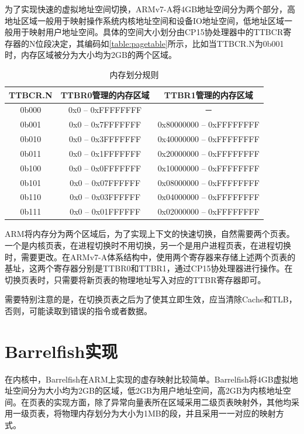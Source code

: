 \documentclass[a4paper, 12pt]{report}
\begin{document}
    为了实现快速的虚拟地址空间切换，ARMv7-A将4GB地址空间分为两个部分，高地址区域一般用于映射操作系统内核地址空间和设备IO地址空间，低地址区域一般用于映射用户地址空间。具体的空间大小划分由CP15协处理器中的TTBCR寄存器的N位段决定，其编码如\autoref{table:pagetable}所示，比如当TTBCR.N为0b001时，内存区域被分为大小均为2GB的两个区域。
    
    \begin{table}[htbp]
        \centering
        \caption{内存划分规则}
        \label{table:pagetable}
        \begin{tabular}{ccc}
            \toprule
            TTBCR.N & TTBR0管理的内存区域 & TTBR1管理的内存区域  \\
            \midrule
            0b000 & 0x0 – 0xFFFFFFFF & －  \\
            0b001 & 0x0 – 0x7FFFFFFF & 0x80000000 – 0xFFFFFFFF  \\
            0b010 & 0x0 – 0x3FFFFFFF & 0x40000000 – 0xFFFFFFFF  \\
            0b011 & 0x0 – 0x1FFFFFFF & 0x20000000 – 0xFFFFFFFF  \\
            0b100 & 0x0 – 0x0FFFFFFF & 0x10000000 – 0xFFFFFFFF  \\
            0b101 & 0x0 – 0x07FFFFFF & 0x08000000 – 0xFFFFFFFF  \\
            0b110 & 0x0 – 0x03FFFFFF & 0x04000000 – 0xFFFFFFFF  \\
            0b111 & 0x0 – 0x01FFFFFF & 0x02000000 – 0xFFFFFFFF  \\
            \bottomrule
        \end{tabular}
    \end{table}
    
    ARM将内存分为两个区域后，为了实现上下文的快速切换，自然需要两个页表。一个是内核页表，在进程切换时不用切换，另一个是用户进程页表，在进程切换时，需要更改。在ARMv7-A体系结构中，使用两个寄存器来存储上述两个页表的基址，这两个寄存器分别是TTBR0和TTBR1，通过CP15协处理器进行操作。在切换页表时，只需要将新页表的物理地址写入对应的TTBR寄存器即可。

    需要特别注意的是，在切换页表之后为了使其立即生效，应当清除Cache和TLB，否则，可能读取到错误的指令或者数据。
    
    \section{Barrelfish实现}
    
    在内核中，Barrelfish在ARM上实现的虚存映射比较简单。Barrelfish将4GB虚拟地址空间分为大小均为2GB的区域，低2GB为用户地址空间，高2GB为内核地址空间。在页表的实现方面，除了异常向量表所在区域采用二级页表映射外，其他均采用一级页表，将物理内存划分为大小为1MB的段，并且采用一一对应的映射方式。
    
\end{document}
